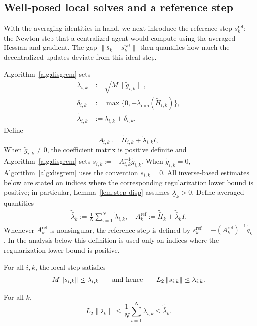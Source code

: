 \documentclass[review,onefignum,onetabnum]{siamart171218}
\begin{document}
	\subsection{Well-posed local solves and a reference step}\label{ssec:refstep}
	With the averaging identities in hand, we next introduce the
	reference step $s_k^{\mathrm{ref}}$: the Newton step that a
	centralized agent would compute using the averaged Hessian and gradient.
	The gap $\|\bar s_k - s_k^{\mathrm{ref}}\|$ then quantifies how much the
	decentralized updates deviate from this ideal step.
	
	Algorithm~\ref{alg:disgrem} sets
	\begin{align*}
		\lambda_{i,k}&:=\sqrt{M\|\tilde g_{i,k}\|},\\
		\delta_{i,k}&:=\max\{0,-\lambda_{\min}(\tilde H_{i,k})\},\\
		\tilde\lambda_{i,k}&:=\lambda_{i,k}+\delta_{i,k}.
	\end{align*}
	Define
	\[
	A_{i,k}:=\tilde H_{i,k}+\tilde\lambda_{i,k}I,
	\]
	When $\tilde g_{i,k}\ne0$, the coefficient matrix is positive
	definite and Algorithm~\ref{alg:disgrem} sets
	$s_{i,k}:=-A_{i,k}^{-1}\tilde g_{i,k}$.
	When $\tilde g_{i,k}=0$, Algorithm~\ref{alg:disgrem} uses the
	convention $s_{i,k}=0$.
	All inverse-based estimates below are stated on indices where the
	corresponding regularization lower bound is positive; in particular,
	Lemma~\ref{lem:step-disp} assumes $\underline\lambda_k>0$.
	Define averaged quantities
	\begin{gather*}
		\tilde{\bar\lambda}_k:=\tfrac1N\textstyle\sum_{i=1}^N \tilde\lambda_{i,k},\quad
		A_k^{\mathrm{ref}}:=\tilde{\bar H}_k+\tilde{\bar\lambda}_k I.
	\end{gather*}
	Whenever $A_k^{\mathrm{ref}}$ is nonsingular, the reference step is
	defined by $s_k^{\mathrm{ref}}=-(A_k^{\mathrm{ref}})^{-1}\tilde{\bar g}_k$.
	In the analysis below this definition is used only on indices where
	the regularization lower bound is positive.
	
	\begin{lemma}\label{lem:M-vs-s}
		For all $i,k$, the local step satisfies
		\[
		M\left\|s_{i,k}\right\|\le \lambda_{i,k}
		\qquad\text{and hence}\qquad
		L_2\left\|s_{i,k}\right\|\le \lambda_{i,k}.
		\]
	\end{lemma}
	
	\begin{lemma}\label{lem:avg-regime}
		For all $k$,
		\[
		L_2\|\bar s_k\|\le \frac1N\sum_{i=1}^N \lambda_{i,k}\le \tilde{\bar\lambda}_k.
		\]
	\end{lemma}
	
\end{document}
